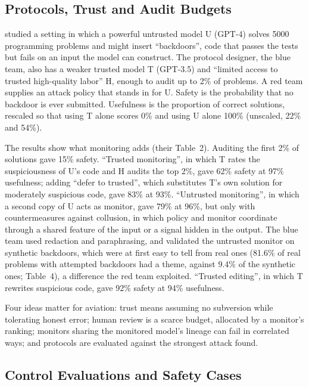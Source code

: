 \documentclass{aer}
\begin{document}
\subsection{Protocols, Trust and Audit Budgets}\label{sec:protocols}

\citet{greenblatt2023control} studied a setting in which a powerful untrusted model U (GPT-4) solves \num{5000} programming problems and might insert ``backdoors'', code that passes the tests but fails on an input the model can construct. The protocol designer, the blue team, also has a weaker trusted model T (GPT-3.5) and ``limited access to trusted high-quality labor'' H, enough to audit up to 2\% of problems. A red team supplies an attack policy that stands in for U. Safety is the probability that no backdoor is ever submitted. Usefulness is the proportion of correct solutions, rescaled so that using T alone scores 0\% and using U alone 100\% (unscaled, 22\% and 54\%).

The results show what monitoring adds (their Table~2). Auditing the first 2\% of solutions gave 15\% safety. ``Trusted monitoring'', in which T rates the suspiciousness of U's code and H audits the top 2\%, gave 62\% safety at 97\% usefulness; adding ``defer to trusted'', which substitutes T's own solution for moderately suspicious code, gave 83\% at 93\%. ``Untrusted monitoring'', in which a second copy of U acts as monitor, gave 79\% at 96\%, but only with countermeasures against collusion, in which policy and monitor coordinate through a shared feature of the input or a signal hidden in the output. The blue team used redaction and paraphrasing, and validated the untrusted monitor on synthetic backdoors, which were at first easy to tell from real ones (81.6\% of real problems with attempted backdoors had a theme, against 9.4\% of the synthetic ones; Table~4), a difference the red team exploited. ``Trusted editing'', in which T rewrites suspicious code, gave 92\% safety at 94\% usefulness.

Four ideas matter for aviation: trust means assuming no subversion while tolerating honest error; human review is a scarce budget, allocated by a monitor's ranking; monitors sharing the monitored model's lineage can fail in correlated ways; and protocols are evaluated against the strongest attack found.

\subsection{Control Evaluations and Safety Cases}\label{sec:safetycases}
\end{document}
